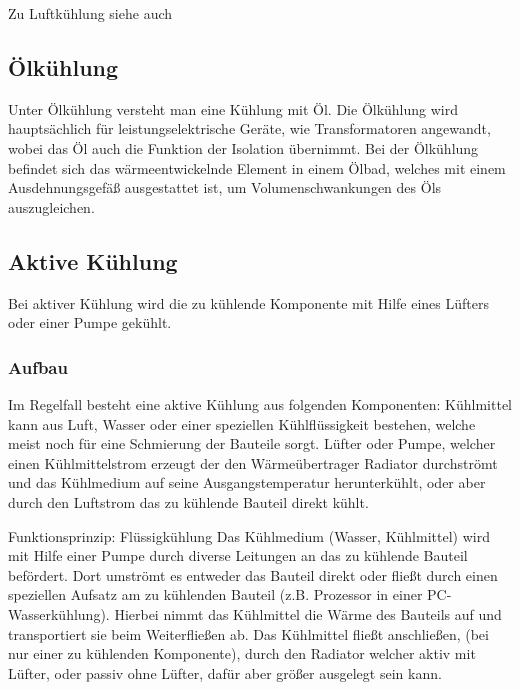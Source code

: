 Zu Luftkühlung siehe auch \cite{Luftkuehlung1,Luftkuehlung2}


\subsection{Ölkühlung}

Unter Ölkühlung versteht man eine Kühlung mit Öl. Die Ölkühlung wird hauptsächlich für leistungselektrische Geräte, wie Transformatoren angewandt, wobei das Öl auch die Funktion der Isolation übernimmt. Bei der Ölkühlung befindet sich das wärmeentwickelnde Element in einem Ölbad, welches mit einem Ausdehnungsgefäß ausgestattet ist, um Volumenschwankungen des Öls auszugleichen.


\newpage

\subsection{Aktive Kühlung} 

Bei aktiver Kühlung wird die zu kühlende Komponente mit Hilfe eines Lüfters oder einer Pumpe gekühlt.
\subsubsection{Aufbau}

Im Regelfall besteht eine aktive Kühlung aus folgenden Komponenten:
Kühlmittel kann aus Luft, Wasser oder einer speziellen Kühlflüssigkeit bestehen, welche meist noch für eine Schmierung der Bauteile sorgt.
Lüfter oder Pumpe, welcher einen Kühlmittelstrom erzeugt der den Wärmeübertrager Radiator durchströmt und das Kühlmedium auf seine Ausgangstemperatur herunterkühlt, oder aber durch den Luftstrom das zu kühlende Bauteil direkt kühlt.

Funktionsprinzip: Flüssigkühlung
Das Kühlmedium (Wasser, Kühlmittel) wird mit Hilfe einer Pumpe durch diverse Leitungen an das zu kühlende Bauteil befördert. Dort umströmt es entweder das Bauteil direkt oder fließt durch einen speziellen Aufsatz am zu kühlenden Bauteil (z.B. Prozessor in einer PC-Wasserkühlung).
Hierbei nimmt das Kühlmittel die Wärme des Bauteils auf und transportiert sie beim Weiterfließen ab.
Das Kühlmittel fließt anschließen, (bei nur einer zu kühlenden Komponente), durch den Radiator welcher aktiv mit Lüfter, oder passiv ohne Lüfter, dafür aber größer ausgelegt sein kann.

